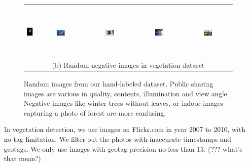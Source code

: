 \begin{figure}[th]
{{\begin{center}
\begin{tabular}{@{}c@{\,\,\,}c@{\,\,\,}c@{\,\,\,}c@{\,\,\,}c@{\,\,\,}}
\\[-6pt]
\hline
\\[-6pt]
\includegraphics[height=1in]{imggrid/datasetnega/6.jpg} &
\includegraphics[width=0.19\textwidth]{imggrid/datasetnega/7.jpg} &
\includegraphics[width=0.19\textwidth]{imggrid/datasetnega/8.jpg} &
\includegraphics[width=0.19\textwidth]{imggrid/datasetnega/9.jpg} &
\includegraphics[width=0.19\textwidth]{imggrid/datasetnega/10.jpg} \\
\multicolumn{5}{c}{(b) Random negative images in vegetation dataset} \\
\end{tabular}
\end{center}
}}
\caption{Random images from our hand-labeled dataset. Public sharing images are various in quality, contents, illumination and view angle.
Negative images like winter trees without leaves, or indoor images capturing a photo of forest are more confusing.}
\label{fig:dataset}
\end{figure}




In vegetation detection, we use images on Flickr.com in year 2007 to 2010, with no tag limitation. We filter out the photos with inaccurate timestamps and geotags. We only use images with geotag precision no less than 13. (??? what's that mean?) 

